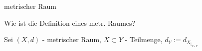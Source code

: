 \documentclass[class=article, crop=false]{standalone}
\begin{document}
\begin{zettel}{metrischer Raum}
\begin{flashcard}
\begin{question}
    Wie ist die Definition eines metr. Raumes?
\end{question}

    Sei $(X,d)$ - metrischer Raum, $X \subset Y$ - Teilmenge, $d_Y := d_{X_{|_{Y \times Y} } }  $ 

\end{flashcard}
\end{zettel}
\end{document}
